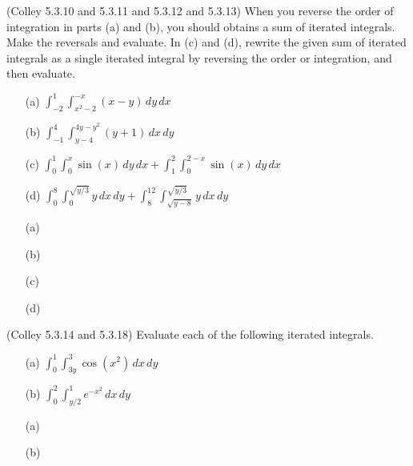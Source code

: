 \documentclass[11pt,letterpaper,cm]{nupset}
\begin{document}
\begin{problem}[Exercise 9] (Colley 5.3.10 and 5.3.11 and 5.3.12 and 5.3.13) When you reverse the order of integration in parts (a) and (b), you should obtains a sum of iterated integrals. Make the reversals and evaluate.  In (c) and (d), rewrite the given sum of iterated integrals as a single iterated integral by reversing the order or integration, and then evaluate.
	\begin{itemize}
		\item[(a)] $\displaystyle \int_{-2}^1 \int_{x^2-2}^{-x} (x-y)\,dy\,dx$
		\item[(b)] $\displaystyle \int_{-1}^4 \int_{y-4}^{4y-y^2} (y+1)\,dx\,dy$
		\item[(c)] $\displaystyle \int_0^1 \int_0^x \sin(x)\,dy\,dx + \int_1^2\int_0^{2-x} \sin(x)\,dy\,dx$
		\item[(d)] $\displaystyle \int_0^8 \int_0^{\sqrt{y/3}} y\,dx\,dy+\int_8^{12}\int_{\sqrt{y-8}}^{\sqrt{y/3}} y\,dx\,dy$
	\end{itemize}
\end{problem}
\begin{solution}
	\begin{itemize}
		\item[(a)]
		\item[(b)]
		\item[(c)]
		\item[(d)]
	\end{itemize}
\end{solution}
\newpage

\begin{problem}[Exercise 10] (Colley 5.3.14 and 5.3.18) Evaluate each of the following iterated integrals.
	\begin{itemize}
		\item[(a)] $\displaystyle\int_0^1 \int_{3y}^3 \cos(x^2)\,dx\,dy$
		\item[(b)] $\displaystyle\int_0^2 \int_{y/2}^1 e^{-x^2}\,dx\,dy$
	\end{itemize}
\end{problem}
\begin{solution}
	\begin{itemize}
		\item[(a)]
		\item[(b)]
	\end{itemize}
\end{solution}
\end{document}
